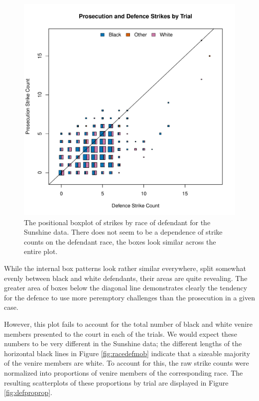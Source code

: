 \documentclass[12pt]{article}
\begin{document}
\begin{figure}[h!]
  \centering
  \includegraphics[scale=0.7]{DefProStrikesTrial}
  \caption[Prosecution and Defence Strikes by Trial]{\footnotesize The positional boxplot of strikes by race of defendant for the
    Sunshine data. There does not seem to be a dependence of strike counts on the defendant race, the boxes look similar across
    the entire plot.}
  \label{fig:trialprodef}
\end{figure}

While the internal box patterns look rather similar everywhere, split somewhat evenly between black and white defendants, their areas are quite revealing. The greater area of boxes below the diagonal line demonstrates clearly the tendency for the defence to use more peremptory challenges than the prosecution in a given case.

However, this plot fails to account for the total number of black and white venire members presented to the court in each of the trials. We would expect these numbers to be very different in the Sunshine data; the different lengths of the horizontal black lines in Figure \ref{fig:racedefmob} indicate that a sizeable majority of the venire members are white. To account for this, the raw strike counts were normalized into proportions of venire members of the corresponding race. The resulting scatterplots of these proportions by trial are displayed in Figure \ref{fig:defproprop}.
\end{document}
